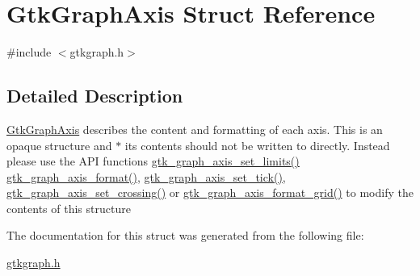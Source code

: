 \hypertarget{struct_gtk_graph_axis}{
\section{GtkGraphAxis Struct Reference}
\label{struct_gtk_graph_axis}
}


{\ttfamily \#include $<$gtkgraph.h$>$}



\subsection{Detailed Description}
\hyperlink{struct_gtk_graph_axis}{GtkGraphAxis} describes the content and formatting of each axis. This is an opaque structure and $\ast$ its contents should not be written to directly. Instead please use the API functions \hyperlink{gtkgraph_8h_af496e4f1eeb700326be471f23cfbae39}{gtk\_\-graph\_\-axis\_\-set\_\-limits()} \hyperlink{gtkgraph_8h_a35458ae0311500eac317eb9c525d0b18}{gtk\_\-graph\_\-axis\_\-format()}, \hyperlink{gtkgraph_8h_a349339d011d0b7df44a52231764b5baa}{gtk\_\-graph\_\-axis\_\-set\_\-tick()}, \hyperlink{gtkgraph_8h_ac6472ddc01480db45cc28c1e6b525a6a}{gtk\_\-graph\_\-axis\_\-set\_\-crossing()} or \hyperlink{gtkgraph_8h_ab4e5de677d315a0f2a1a469ec1ebdf8b}{gtk\_\-graph\_\-axis\_\-format\_\-grid()} to modify the contents of this structure 

The documentation for this struct was generated from the following file:\begin{DoxyCompactItemize}
\item 
\hyperlink{gtkgraph_8h}{gtkgraph.h}\end{DoxyCompactItemize}
